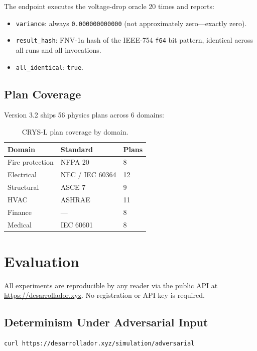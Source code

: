 \documentclass[10pt,twocolumn]{article}
\begin{document}
The endpoint executes the voltage-drop oracle 20 times and reports:
\begin{itemize}
\item \texttt{variance}: always \texttt{0.000000000000} (not approximately zero---exactly zero).
\item \texttt{result\_hash}: FNV-1a hash of the IEEE-754 \texttt{f64} bit pattern, identical across all runs and all invocations.
\item \texttt{all\_identical}: \texttt{true}.
\end{itemize}

\subsection{Plan Coverage}

Version 3.2 ships 56 physics plans across 6 domains:

\begin{table}[h]
\centering
\small
\begin{tabular}{lll}
\toprule
Domain & Standard & Plans \\
\midrule
Fire protection & NFPA 20 & 8 \\
Electrical & NEC / IEC 60364 & 12 \\
Structural & ASCE 7 & 9 \\
HVAC & ASHRAE & 11 \\
Finance & --- & 8 \\
Medical & IEC 60601 & 8 \\
\bottomrule
\end{tabular}
\caption{CRYS-L plan coverage by domain.}
\label{tab:plans}
\end{table}

\section{Evaluation}
\label{sec:eval}

All experiments are reproducible by any reader via the public API at
\url{https://desarrollador.xyz}. No registration or API key is required.

\subsection{Determinism Under Adversarial Input}

\begin{lstlisting}[language=bash]
curl https://desarrollador.xyz/simulation/adversarial
\end{lstlisting}
\end{document}
